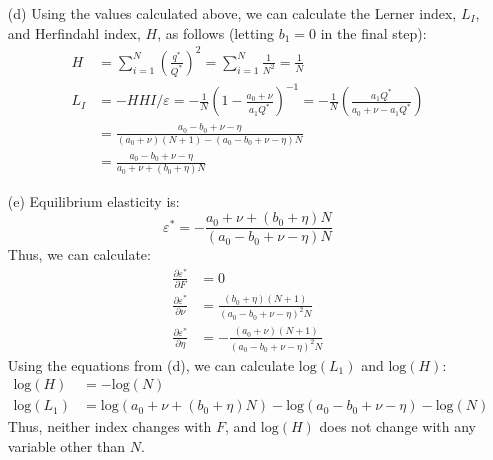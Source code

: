 \documentclass{article}
\newcommand{\loge}[1]{\text{log}\left(#1\right)}
\newcommand{\pl}{\partial}
\begin{document}
\begin{itemize}
    \item[(d)] Using the values calculated above, we can calculate the Lerner index, $L_I$, and Herfindahl index, $H$, as follows (letting ${b_1=0}$ in the final step): \begin{align*} 
      H &= \sum_{i=1}^N\left(\frac{q^*}{Q^*}\right)^2 = \sum_{i=1}^N\frac{1}{N^2} = \frac{1}{N} \\
      L_I &=  -HHI/\varepsilon = -\frac{1}{N}\left(1 - \frac{a_0 + \nu}{a_1Q^*}\right)^{-1} =  -\frac{1}{N}\left(\frac{a_1Q^*}{a_0 + \nu - a_1Q^*}\right) \\ &= \frac{a_0-b_0+\nu-\eta}{(a_0 + \nu)(N+1) - \left(a_0-b_0+\nu-\eta\right)N} \\
      &= \frac{a_0-b_0+\nu-\eta}{a_0 + \nu + (b_0 + \eta)N}
    \end{align*} 

    \item[(e)] Equilibrium elasticity is:\[
      \varepsilon^* = -\frac{a_0 + \nu + (b_0 + \eta)N}{(a_0-b_0+\nu-\eta)N}
    \]
    Thus, we can calculate: \begin{align*}
      \frac{\pl\varepsilon^*}{\pl F}    &= 0                                                \\
      \frac{\pl\varepsilon^*}{\pl \nu}  &= \frac{(b_0+\eta)(N+1)}{(a_0-b_0+\nu-\eta)^2N}   \\
      \frac{\pl\varepsilon^*}{\pl \eta} &= -\frac{(a_0+\nu)(N+1)}{(a_0-b_0+\nu-\eta)^2N}  
    \end{align*}
    Using the equations from (d), we can calculate $\loge{L_1}$ and $\loge{H}$:\begin{align*}
      \loge{H}    &= -\loge{N}  \\
      \loge{L_1}  &= \loge{a_0 + \nu + (b_0 + \eta)N} - \loge{a_0-b_0+\nu-\eta} - \loge{N}
    \end{align*}
    Thus, neither index changes with $F$, and $\loge{H}$ does not change with any variable other than $N$.


\end{itemize}
\end{document}
